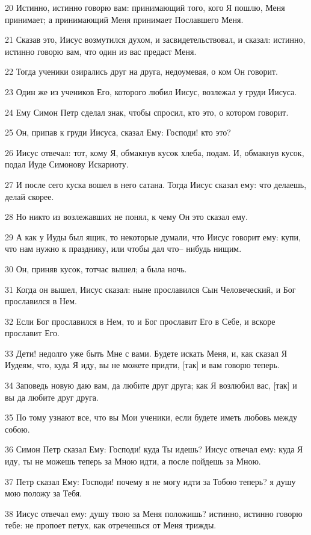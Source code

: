 \par 20 Истинно, истинно говорю вам: принимающий того, кого Я пошлю, Меня принимает; а принимающий Меня принимает Пославшего Меня.
\par 21 Сказав это, Иисус возмутился духом, и засвидетельствовал, и сказал: истинно, истинно говорю вам, что один из вас предаст Меня.
\par 22 Тогда ученики озирались друг на друга, недоумевая, о ком Он говорит.
\par 23 Один же из учеников Его, которого любил Иисус, возлежал у груди Иисуса.
\par 24 Ему Симон Петр сделал знак, чтобы спросил, кто это, о котором говорит.
\par 25 Он, припав к груди Иисуса, сказал Ему: Господи! кто это?
\par 26 Иисус отвечал: тот, кому Я, обмакнув кусок хлеба, подам. И, обмакнув кусок, подал Иуде Симонову Искариоту.
\par 27 И после сего куска вошел в него сатана. Тогда Иисус сказал ему: что делаешь, делай скорее.
\par 28 Но никто из возлежавших не понял, к чему Он это сказал ему.
\par 29 А как у Иуды был ящик, то некоторые думали, что Иисус говорит ему: купи, что нам нужно к празднику, или чтобы дал что-- нибудь нищим.
\par 30 Он, приняв кусок, тотчас вышел; а была ночь.
\par 31 Когда он вышел, Иисус сказал: ныне прославился Сын Человеческий, и Бог прославился в Нем.
\par 32 Если Бог прославился в Нем, то и Бог прославит Его в Себе, и вскоре прославит Его.
\par 33 Дети! недолго уже быть Мне с вами. Будете искать Меня, и, как сказал Я Иудеям, что, куда Я иду, вы не можете придти, [так] и вам говорю теперь.
\par 34 Заповедь новую даю вам, да любите друг друга; как Я возлюбил вас, [так] и вы да любите друг друга.
\par 35 По тому узнают все, что вы Мои ученики, если будете иметь любовь между собою.
\par 36 Симон Петр сказал Ему: Господи! куда Ты идешь? Иисус отвечал ему: куда Я иду, ты не можешь теперь за Мною идти, а после пойдешь за Мною.
\par 37 Петр сказал Ему: Господи! почему я не могу идти за Тобою теперь? я душу мою положу за Тебя.
\par 38 Иисус отвечал ему: душу твою за Меня положишь? истинно, истинно говорю тебе: не пропоет петух, как отречешься от Меня трижды.

